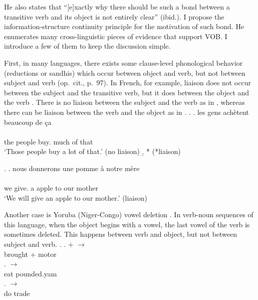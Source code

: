 He also states that
``[e]xactly why there should be such a bond between a transitive verb and its object is not entirely clear'' (ibid.).
I propose the information-structure continuity principle
for the motivation of such bond.
He enumerates many cross-linguistic pieces of evidence that support VOB.
I introduce a few of them to keep the discussion simple.

First,
in many languages,
there exists some clause-level phonological behavior
(reductions or sandhis) which occur between object and verb,
but not between subject and verb (op.~cit., p.~97).
In French, for example,
liaison does not occur between the subject and the transitive verb,
but it does between the object and the verb \cite[see also][]{selkirk72}.
There is no liaison between the subject  and the verb  as in \Next,
whereas there can be liaison between the verb  and the object  as in \NNext.%
%
\ex.
 \a. \glll
	les gens ach\`{e}tent beaucoup de \c{c}a \\
	      \\
	the people buy. much of that \\
	`Those people buy a lot of that.' \hfill{(no liaison)}
 \b. *      
 		 \hfill{(*liaison)}

\ex.
 \a. \glll
	nous donnerons une pomme \`a notre m\`ere \\
  	       \\
	we give. a apple to our mother \\
	`We will give an apple to our mother.'
	\hfill{(liaison)}
\begin{flushright}
\cite[][pp.~98-99, transcription modified based on standard French]{tomlin86}
\end{flushright}

Another case is Yoruba (Niger-Congo) vowel deletion \cite[from][]{bamgbose64}.
In verb-noun sequences of this language,
when the object begins with a vowel,
the last vowel of the verb is sometimes deleted.
This happens between verb and object, but not between subject and verb.
%
\ex.
 \ag.  +  $\to$  \\
		brought + motor \\
 \bg.   $\to$  \\
 		eat pounded.yam \\
 \bg.   $\to$  \\
 		do trade \\
		\hfill{\cite[][pp.~29--30]{bamgbose64}}

